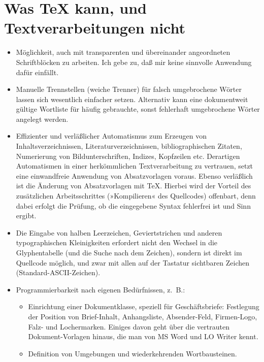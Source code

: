 \documentclass[11pt,a4paper,ngerman,DIV=8]{scrartcl}
\begin{document}
\section{Was \TeX{} kann, und Textverarbeitungen nicht}

\begin{itemize}
  \item Möglichkeit, auch mit transparenten und übereinander angeordneten Schriftblöcken zu arbeiten. Ich gebe zu, daß mir keine sinnvolle Anwendung dafür einfällt.
  \item Manuelle Trennstellen (weiche Trenner) für falsch umgebrochene Wörter lassen sich wesentlich einfacher setzen. Alternativ kann eine dokumentweit gültige Wortliste für häufig gebrauchte, sonst fehlerhaft umgebrochene Wörter angelegt werden.
  \item Effizienter und verläßlicher Automatismus zum Erzeugen von Inhaltsverzeichnissen, Literaturverzeichnissen, bibliographischen Zitaten, Numerierung von Bildunterschriften, Indizes, Kopfzeilen etc. Derartigen Automatismen in einer herkömmlichen Textverarbeitung zu vertrauen, setzt eine einwandfreie Anwendung von Absatzvorlagen voraus. Ebenso verläßlich ist die Änderung von Absatzvorlagen mit \TeX{}. Hierbei wird der Vorteil des zusätzlichen Arbeitsschrittes (»Kompilieren« des Quellcodes) offenbart, denn dabei erfolgt die Prüfung, ob die eingegebene Syntax fehlerfrei ist und Sinn ergibt.
  \item Die Eingabe von halben Leerzeichen, Geviertstrichen und anderen typographischen Kleinigkeiten erfordert nicht den Wechsel in die Glyphentabelle (und die Suche nach dem Zeichen), sondern ist direkt im Quellcode möglich, und zwar mit allen auf der Tastatur sichtbaren Zeichen (Standard-ASCII-Zeichen).
  \item Programmierbarkeit nach eigenen Bedürfnissen, z.~B.:
  \begin{itemize}
    \item Einrichtung einer Dokumentklasse, speziell für Geschäftsbriefe: Festlegung der Position von Brief-Inhalt, Anhangsliste, Absender-Feld, Firmen-Logo, Falz- und Lochermarken. Einiges davon geht über die vertrauten Dokument-Vorlagen hinaus, die man von MS Word und LO Writer kennt.
    \item Definition von Umgebungen und wiederkehrenden Wortbausteinen.
  \end{itemize}

\end{itemize}
\end{document}
